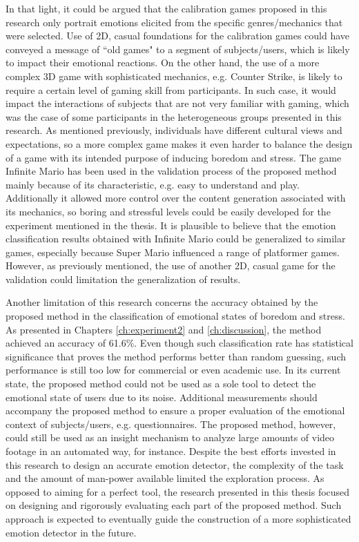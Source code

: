 In that light, it could be argued that the calibration games proposed in this research only portrait emotions elicited from the specific genres/mechanics that were selected. Use of 2D, casual foundations for the calibration games could have conveyed a message of ``old games" to a segment of subjects/users, which is likely to impact their emotional reactions. On the other hand, the use of a more complex 3D game with sophisticated mechanics, e.g. Counter Strike, is likely to require a certain level of gaming skill from participants. In such case, it would impact the interactions of subjects that are not very familiar with gaming, which was the case of some participants in the heterogeneous groups presented in this research. As mentioned previously, individuals have different cultural views and expectations, so a more complex game makes it even harder to balance the design of a game with its intended purpose of inducing boredom and stress. The game Infinite Mario has been used in the validation process of the proposed method mainly because of its characteristic, e.g. easy to understand and play. Additionally it allowed more control over the content generation associated with its mechanics, so boring and stressful levels could be easily developed for the experiment mentioned in the thesis. It is plausible to believe that the emotion classification results obtained with Infinite Mario could be generalized to similar games, especially because Super Mario influenced a range of platformer games. However, as previously mentioned, the use of another 2D, casual game for the validation could limitation the generalization of results.

Another limitation of this research concerns the accuracy obtained by the proposed method in the classification of emotional states of boredom and stress. As presented in Chapters \ref{ch:experiment2} and \ref{ch:discussion}, the method achieved an accuracy of 61.6\%. Even though such classification rate has statistical significance that proves the method performs better than random guessing, such performance is still too low for commercial or even academic use. In its current state, the proposed method could not be used as a sole tool to detect the emotional state of users due to its noise. Additional measurements should accompany the proposed method to ensure a proper evaluation of the emotional context of subjects/users, e.g. questionnaires. The proposed method, however, could still be used as an insight mechanism to analyze large amounts of video footage in an automated way, for instance. Despite the best efforts invested in this research to design an accurate emotion detector, the complexity of the task and the amount of man-power available limited the exploration process. As opposed to aiming for a perfect tool, the research presented in this thesis focused on designing and rigorously evaluating each part of the proposed method. Such approach is expected to eventually guide the construction of a more sophisticated emotion detector in the future.

